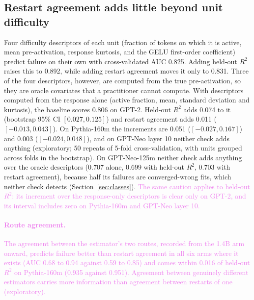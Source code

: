 \documentclass[10pt]{article}
\newcommand{\draft}[1]{\textcolor{violet}{#1}}
\begin{document}
\subsection{Restart agreement adds little beyond unit difficulty}
Four difficulty descriptors of each unit (fraction of tokens on which it is active, mean
pre-activation, response kurtosis, and the GELU first-order coefficient) predict failure on
their own with cross-validated AUC 0.825. Adding held-out $R^2$ raises this to 0.892, while
adding restart agreement moves it only to 0.831. Three of the four descriptors, however, are
computed from the true pre-activation, so they are oracle covariates that a practitioner
cannot compute. With
descriptors computed from the response alone (active fraction, mean, standard deviation and
kurtosis), the baseline scores 0.806 on GPT-2. Held-out $R^2$ adds 0.074 to it (bootstrap 95\%
CI $[0.027, 0.125]$) and restart agreement adds 0.011 ($[-0.013, 0.043]$). On Pythia-160m the
increments are 0.051 ($[-0.027, 0.167]$) and 0.003 ($[-0.024, 0.048]$), and on GPT-Neo layer 10
neither check adds anything (exploratory; 50 repeats of 5-fold cross-validation, with units
grouped across folds in the bootstrap). On GPT-Neo-125m neither check adds anything
over the oracle descriptors (0.707 alone, 0.699 with held-out $R^2$, 0.703 with restart
agreement), because half its failures are converged-wrong fits, which neither check detects
(Section~\ref{sec:classes}). \draft{The same caution applies to held-out $R^2$: its increment
over the response-only descriptors is clear only on GPT-2, and its interval includes zero on
Pythia-160m and GPT-Neo layer 10.}

\draft{\paragraph{Route agreement.} The agreement between the estimator's two routes, recorded from
the 1.4B arm onward, predicts failure better than restart agreement in all six arms where it
exists (AUC 0.68 to 0.94 against 0.59 to 0.85) and comes within 0.016 of held-out $R^2$ on
Pythia-160m (0.935 against 0.951). Agreement between genuinely different estimators carries
more information than agreement between restarts of one (exploratory).}
\end{document}
